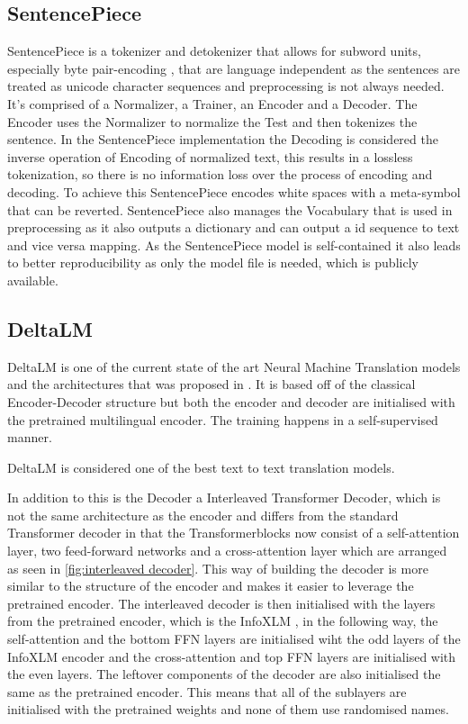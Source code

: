 \subsection{SentencePiece}
SentencePiece \cite{kudo-richardson-2018-sentencepiece} is a tokenizer and detokenizer that allows for subword units, especially byte pair-encoding \cite{sennrich-etal-2016-neural}, that are language independent as the sentences are treated as unicode character sequences and preprocessing is not always needed. 
It's comprised of a Normalizer, a Trainer, an Encoder and a Decoder. 
The Encoder uses the Normalizer to normalize the Test and then tokenizes the sentence. 
In the SentencePiece implementation the Decoding is considered the inverse operation of Encoding of normalized text, this results in a lossless tokenization, so there is no information loss over the process of encoding and decoding. 
To achieve this SentencePiece encodes white spaces with a meta-symbol that can be reverted. 
SentencePiece also manages the Vocabulary that is used in preprocessing as it also outputs a dictionary and can output a id sequence to text and vice versa mapping. 
As the SentencePiece model is self-contained it also leads to better reproducibility as only the model file is needed, which is publicly available. 

\subsection{DeltaLM}
DeltaLM is one of the current state of the art Neural Machine Translation models and the architectures that was proposed in \cite{ma2021deltalm}. 
It is based off of the classical Encoder-Decoder structure but both the encoder and decoder are initialised with the pretrained multilingual encoder. 
The training happens in a self-supervised manner. 

DeltaLM is considered one of the best text to text translation models. 

In addition to this is the Decoder a Interleaved Transformer Decoder, which is not the same architecture as the encoder and differs from the standard Transformer decoder in that the Transformerblocks now consist of a self-attention layer, two feed-forward networks and a cross-attention layer which are arranged as seen in \ref{fig:interleaved decoder}. 
This way of building the decoder is more similar to the structure of the encoder and makes it easier to leverage the pretrained encoder. 
The interleaved decoder is then initialised with the layers from the pretrained encoder, which is the InfoXLM \cite{chi2021infoxlminformationtheoreticframeworkcrosslingual}, in the following way, the self-attention and the bottom FFN layers are initialised wiht the odd layers of the InfoXLM encoder and the cross-attention and top FFN layers are initialised with the even layers. 
The leftover components of the decoder are also initialised the same as the pretrained encoder. 
This means that all of the sublayers are initialised with the pretrained weights and none of them use randomised names. 


